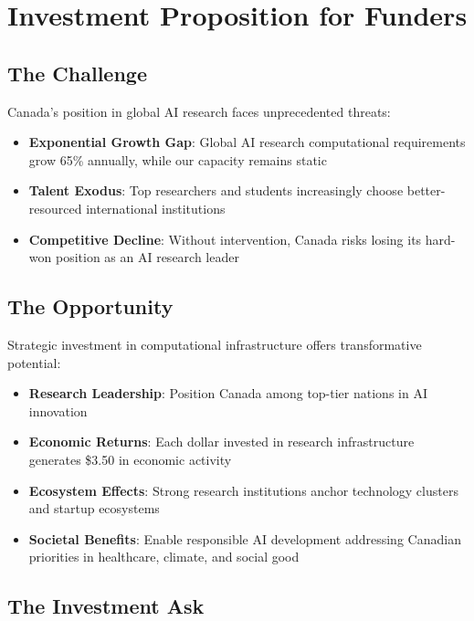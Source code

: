 \section{Investment Proposition for Funders}

\subsection{The Challenge}

Canada's position in global AI research faces unprecedented threats:

\begin{itemize}
\item \textbf{Exponential Growth Gap}: Global AI research computational requirements grow 65\% annually, while our capacity remains static
\item \textbf{Talent Exodus}: Top researchers and students increasingly choose better-resourced international institutions
\item \textbf{Competitive Decline}: Without intervention, Canada risks losing its hard-won position as an AI research leader
\end{itemize}

\subsection{The Opportunity}

Strategic investment in computational infrastructure offers transformative potential:

\begin{itemize}
\item \textbf{Research Leadership}: Position Canada among top-tier nations in AI innovation
\item \textbf{Economic Returns}: Each dollar invested in research infrastructure generates \$3.50 in economic activity
\item \textbf{Ecosystem Effects}: Strong research institutions anchor technology clusters and startup ecosystems
\item \textbf{Societal Benefits}: Enable responsible AI development addressing Canadian priorities in healthcare, climate, and social good
\end{itemize}

\subsection{The Investment Ask}

